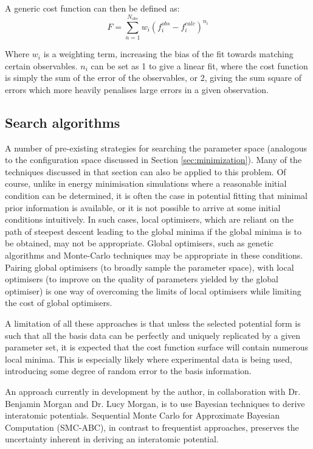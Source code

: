A generic cost function can then be defined as:
\begin{equation}
	F = \sum_{n=1}^{N_{obs}}w_i(f_i^{obs} - f_i^{calc})^{n_i}
\end{equation}

Where $w_i$ is a weighting term, increasing the bias of the fit towards matching certain observables.
$n_i$ can be set as 1 to give a linear fit, where the cost function is simply the sum of the error of the observables, or 2, giving the sum square of errors which more heavily penalises large errors in a given observation.

\subsection{Search algorithms}
A number of pre-existing strategies for searching the parameter space (analogous to the configuration space discussed in Section \ref{sec:minimization}).
Many of the techniques discussed in that section can also be applied to this problem.
Of course, unlike in energy minimisation simulations where a reasonable initial condition can be determined, it is often the case in potential fitting that minimal prior information is available, or it is not possible to arrive at some initial conditions intuitively.
In such cases, local optimisers, which are reliant on the path of steepest descent leading to the global minima if the global minima is to be obtained, may not be appropriate.
Global optimisers, such as genetic algorithms and Monte-Carlo techniques may be appropriate in these conditions.
Pairing global optimisers (to broadly sample the parameter space), with local optimisers (to improve on the quality of parameters yielded by the global optimiser) is one way of overcoming the limits of local optimisers while limiting the cost of global optimisers.

A limitation of all these approaches is that unless the selected potential form is such that all the basis data can be perfectly and uniquely replicated by a given parameter set, it is expected that the cost function surface will contain numerous local minima.
This is especially likely where experimental data is being used, introducing some degree of random error to the basis information.

An approach currently in development by the author, in collaboration with Dr. Benjamin Morgan and Dr. Lucy Morgan, is to use Bayesian techniques to derive interatomic potentials.
Sequential Monte Carlo for Approximate Bayesian Computation (SMC-ABC),\cite{Toni2009a} in contrast to frequentist approaches, preserves the uncertainty inherent in deriving an interatomic potential.

